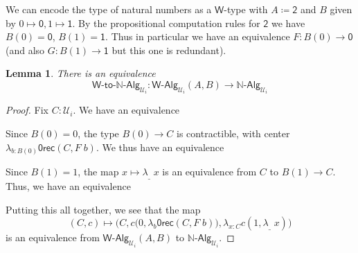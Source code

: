 \documentclass[11pt]{article}
\newcommand{\prd}[1]{\Pi_{#1}}
\newcommand{\lam}[1]{\lambda_{#1}}
\newcommand{\defeq}{\coloneqq}
\newcommand{\nat}{\ensuremath{\mathbb{N}}}
\newcommand{\W}{\mathsf{W}}
\newcommand{\Bool}{\mathsf{2}}
\newcommand{\one}{\mathsf{1}}
\newcommand{\zero}{\mathsf{0}}
\newcommand{\UU}{\mathcal{U}}
\newcommand{\NatAlg}{\nat\text{-}\mathsf{Alg}}
\newcommand{\WAlgToNatAlg}{\W\text{-}\mathsf{to}\text{-}\nat\text{-}\mathsf{Alg}}
\newcommand{\WAlg}{\mathsf{W}\text{-}\mathsf{Alg}}
\newcommand{\abort}{\mathsf{0rec}}
\newtheorem{lemma}[theorem]{Lemma}
\theoremstyle{definition}
\begin{document}
We can encode the type of natural numbers as a $\W$-type with $A \defeq \Bool$ and $B$ given by $0 \mapsto \zero, 1 \mapsto \one$. By the propositional computation rules for $\Bool$ we have $B(0) = \zero$, $B(1) = \one$. Thus in particular we have an equivalence $F : B(0) \to \zero$ (and also $G : B(1) \to \one$ but this one is redundant).
\begin{lemma}
There is an equivalence
\[ \WAlgToNatAlg_{\UU_i} : \WAlg_{\UU_i}(A,B) \to \NatAlg_{\UU_i} \]
\end{lemma}
\begin{proof}
Fix $C : \UU_i$. We have an equivalence
\begin{center}
\end{center}
Since $B(0) = 0$, the type $B(0) \to C$ is contractible, with center $\lam{b:B(0)} \abort(C,F \; b)$. We thus have an equivalence
\begin{center}
\end{center}
Since $B(1) = 1$, the map $x \mapsto \lam{\_}\; x$ is an equivalence from $C$ to $B(1) \to C$. Thus, we have an equivalence
\begin{center}
\end{center}
Putting this all together, we see that the map 
\[ (C,c) \mapsto \Big(C,c\big(0,\lam{b} \abort(C,F \; b)\big),\lam{x:C} c(1, \lam{\_} \; x)\Big)\] 
is an equivalence from $\WAlg_{\UU_i}(A,B)$ to $\NatAlg_{\UU_i}$.
\end{proof}
\end{document}
